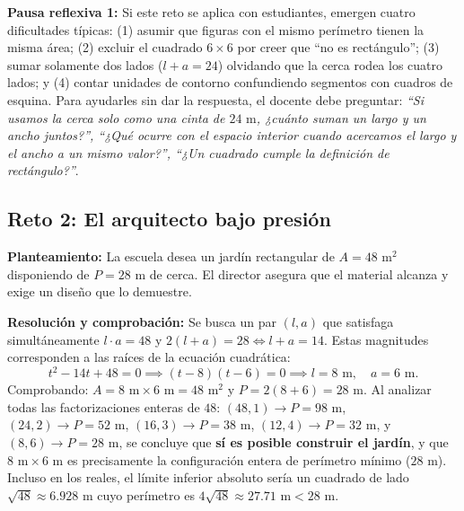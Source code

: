 \documentclass[spanish,letterpaper,oneside]{article}
\begin{document}
\textbf{Pausa reflexiva 1:} Si este reto se aplica con estudiantes, emergen cuatro dificultades típicas: (1) asumir que figuras con el mismo perímetro tienen la misma área; (2) excluir el cuadrado $6\times 6$ por creer que ``no es rectángulo''; (3) sumar solamente dos lados ($l+a=24$) olvidando que la cerca rodea los cuatro lados; y (4) contar unidades de contorno confundiendo segmentos con cuadros de esquina. Para ayudarles sin dar la respuesta, el docente debe preguntar: \textit{``Si usamos la cerca solo como una cinta de $24\text{ m}$, ¿cuánto suman un largo y un ancho juntos?'', ``¿Qué ocurre con el espacio interior cuando acercamos el largo y el ancho a un mismo valor?'', ``¿Un cuadrado cumple la definición de rectángulo?''}.

\subsection{Reto 2: El arquitecto bajo presión}
\textbf{Planteamiento:} La escuela desea un jardín rectangular de $A = 48\text{ m}^2$ disponiendo de $P = 28\text{ m}$ de cerca. El director asegura que el material alcanza y exige un diseño que lo demuestre.

\textbf{Resolución y comprobación:} Se busca un par $(l, a)$ que satisfaga simultáneamente $l\cdot a = 48$ y $2(l + a) = 28 \iff l + a = 14$. Estas magnitudes corresponden a las raíces de la ecuación cuadrática:
\[
t^2 - 14t + 48 = 0 \implies (t - 8)(t - 6) = 0 \implies l = 8\text{ m},\quad a = 6\text{ m}.
\]
Comprobando: $A = 8\text{ m} \times 6\text{ m} = 48\text{ m}^2$ y $P = 2(8 + 6) = 28\text{ m}$. Al analizar todas las factorizaciones enteras de $48$: $(48,1)\to P=98\text{ m}$, $(24,2)\to P=52\text{ m}$, $(16,3)\to P=38\text{ m}$, $(12,4)\to P=32\text{ m}$, y $(8,6)\to P=28\text{ m}$, se concluye que \textbf{sí es posible construir el jardín}, y que $8\text{ m} \times 6\text{ m}$ es precisamente la configuración entera de perímetro mínimo ($28\text{ m}$). Incluso en los reales, el límite inferior absoluto sería un cuadrado de lado $\sqrt{48} \approx 6.928\text{ m}$ cuyo perímetro es $4\sqrt{48} \approx 27.71\text{ m} < 28\text{ m}$.
\end{document}
